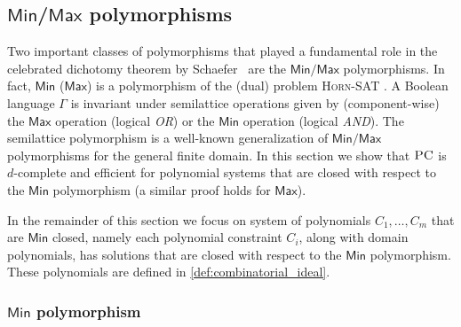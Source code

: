 \documentclass[11pt]{article}
\newcommand{\PC}{\textsc{PC}}
\newcommand{\Max}{\textsf{Max}}
\newcommand{\Min}{\textsf{Min}}
\newcommand{\1}{\textbf{1}}
\begin{document}
\subsection[Min/Max polymorphisms]{$\Min$/$\Max$ polymorphisms}






Two important classes of polymorphisms that played a fundamental role in the celebrated dichotomy theorem by Schaefer~\cite{Schaefer78} are the $\Min/\Max$ polymorphisms. In fact, $\Min$ ($\Max$) is a polymorphism of the (dual) problem \textsc{Horn-SAT} \cite{JEAVONS_TRACTABLE_CONSTRAINTS}. A Boolean language $\Gamma$ is invariant under semilattice operations given by (component-wise) the $\Max$ operation (logical \emph{OR}) or the $\Min$ operation (logical \emph{AND}). The semilattice polymorphism is a well-known generalization of $\Min/\Max$ polymorphisms for the general finite domain.
In this section we show that $\PC$ is $d$-complete and efficient for polynomial systems that are closed with respect to the $\Min$ polymorphism (a similar proof holds for $\Max$). 

















In the remainder of this section we focus on system of polynomials $C_1,\ldots, C_m$ that are $\Min$ closed, namely each polynomial constraint $C_i$, along with domain polynomials, has solutions that are closed with respect to the $\Min$ polymorphism. These polynomials are defined in \cref{def:combinatorial_ideal}.



\subsubsection[Min polymorphism]{$\Min$ polymorphism}
\end{document}

